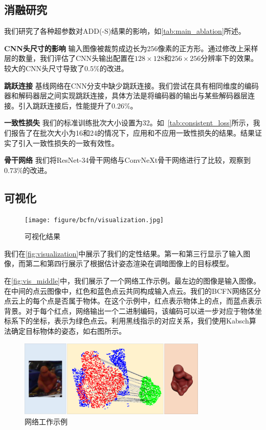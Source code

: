 
\subsection{消融研究}

我们研究了各种超参数对ADD(-S)结果的影响，如\autoref{tab:main_ablation}所述。

\textbf{CNN头尺寸的影响 }输入图像被裁剪成边长为256像素的正方形。通过修改上采样层的数量，我们评估了CNN头输出配置在$128 \times 128$和$256 \times 256$分辨率下的效果。较大的CNN头尺寸导致了$0.5\%$的改进。

\textbf{跳跃连接 }基线网络在CNN分支中缺少跳跃连接。我们尝试在具有相同维度的编码器和解码器层之间实现跳跃连接，具体方法是将编码器的输出与某些解码器层连接。引入跳跃连接后，性能提升了$0.26\%$。



\textbf{一致性损失 }我们的标准训练批次大小设置为32。如~\cref{tab:consistent_loss}所示，我们报告了在批次大小为16和24的情况下，应用和不应用一致性损失的结果。结果证实了引入一致性损失的一致有效性。

\textbf{骨干网络 }我们将ResNet-34骨干网络与ConvNeXt骨干网络进行了比较，观察到$0.73\%$的改进。

\subsection{可视化}

\begin{figure}[htbp]
\centerline{\texttt{[image: figure/bcfn/visualization.jpg]}}
    \caption{可视化结果}
    \label{fig:visualization}
\end{figure}

我们在\autoref{fig:visualization}中展示了我们的定性结果。第一和第三行显示了输入图像，而第二和第四行展示了根据估计姿态渲染在调暗图像上的目标模型。

在\autoref{fig:vis_middle}中，我们展示了一个网络工作示例。最左边的图像是输入图像。在中间的点云图像中，红色和蓝色点云共同构成输入点云。我们的BCFN网络区分点云上的每个点是否属于物体。在这个示例中，红点表示物体上的点，而蓝点表示背景。对于每个红点，网络输出一个二进制编码，该编码可以进一步对应于物体坐标系下的坐标，表示为绿色点云。利用黑线指示的对应关系，我们使用Kabsch算法确定目标物体的姿态，如右图所示。

\begin{figure}[htbp]
\centerline{\includegraphics[width=0.80\textwidth]{figure/bcfn/vis_middle.jpg}}
    \caption{网络工作示例}
    \label{fig:vis_middle}
\end{figure}
